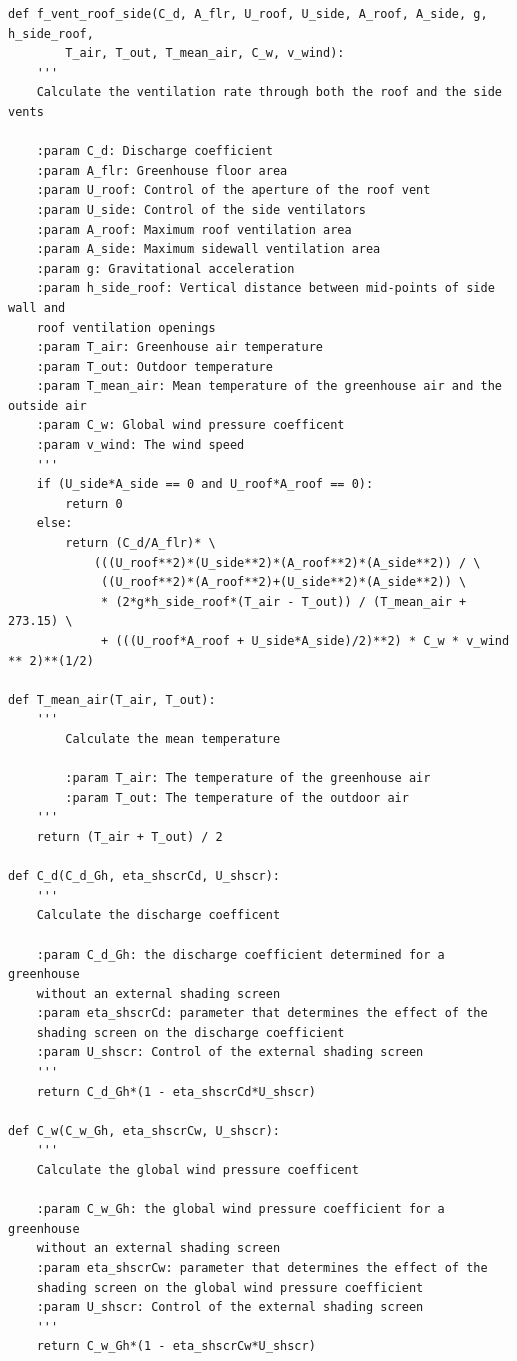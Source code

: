 \documentclass[a4paper]{article}
\begin{document}
\begin{appendices}
\begin{verbatim}
def f_vent_roof_side(C_d, A_flr, U_roof, U_side, A_roof, A_side, g, h_side_roof,
        T_air, T_out, T_mean_air, C_w, v_wind):
    '''
    Calculate the ventilation rate through both the roof and the side vents

    :param C_d: Discharge coefficient
    :param A_flr: Greenhouse floor area
    :param U_roof: Control of the aperture of the roof vent
    :param U_side: Control of the side ventilators
    :param A_roof: Maximum roof ventilation area
    :param A_side: Maximum sidewall ventilation area
    :param g: Gravitational acceleration
    :param h_side_roof: Vertical distance between mid-points of side wall and
    roof ventilation openings
    :param T_air: Greenhouse air temperature
    :param T_out: Outdoor temperature
    :param T_mean_air: Mean temperature of the greenhouse air and the outside air
    :param C_w: Global wind pressure coefficent
    :param v_wind: The wind speed
    '''
    if (U_side*A_side == 0 and U_roof*A_roof == 0):
        return 0
    else:
        return (C_d/A_flr)* \
            (((U_roof**2)*(U_side**2)*(A_roof**2)*(A_side**2)) / \
             ((U_roof**2)*(A_roof**2)+(U_side**2)*(A_side**2)) \
             * (2*g*h_side_roof*(T_air - T_out)) / (T_mean_air + 273.15) \
             + (((U_roof*A_roof + U_side*A_side)/2)**2) * C_w * v_wind ** 2)**(1/2)

def T_mean_air(T_air, T_out):
    '''
        Calculate the mean temperature

        :param T_air: The temperature of the greenhouse air
        :param T_out: The temperature of the outdoor air
    '''
    return (T_air + T_out) / 2

def C_d(C_d_Gh, eta_shscrCd, U_shscr):
    '''
    Calculate the discharge coefficent

    :param C_d_Gh: the discharge coefficient determined for a greenhouse
    without an external shading screen
    :param eta_shscrCd: parameter that determines the effect of the
    shading screen on the discharge coefficient
    :param U_shscr: Control of the external shading screen
    '''
    return C_d_Gh*(1 - eta_shscrCd*U_shscr)

def C_w(C_w_Gh, eta_shscrCw, U_shscr):
    '''
    Calculate the global wind pressure coefficent

    :param C_w_Gh: the global wind pressure coefficient for a greenhouse
    without an external shading screen
    :param eta_shscrCw: parameter that determines the effect of the
    shading screen on the global wind pressure coefficient
    :param U_shscr: Control of the external shading screen
    '''
    return C_w_Gh*(1 - eta_shscrCw*U_shscr)


\end{verbatim}
\end{appendices}
\end{document}
